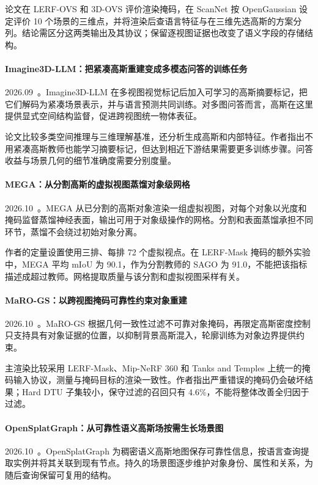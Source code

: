 论文在 LERF-OVS 和 3D-OVS 评价渲染掩码，在 ScanNet 按 OpenGaussian 设定评价 10 个场景的三维点，并将渲染后查语言特征与在三维先选高斯的方案分列。结论需区分这两类输出及其协议；保留逐视图证据也改变了语义字段的存储结构。

\paragraph{Imagine3D-LLM：把紧凑高斯重建变成多模态问答的训练任务}
2026.09~\cite{2609_38177}。Imagine3D-LLM 在多视图视觉标记后加入可学习的高斯摘要标记，把它们解码为紧凑场景表示，并与语言预测共同训练。对多图问答而言，高斯在这里提供显式空间结构监督，促进跨视图统一物体表征。

论文比较多类空间推理与三维理解基准，还分析生成高斯和内部特征。作者指出不用紧凑高斯教师也能学习摘要标记，但达到相近下游结果需要更多训练步骤。问答收益与场景几何的细节准确度需要分别度量。

\paragraph{MEGA：从分割高斯的虚拟视图蒸馏对象级网格}
2026.10~\cite{2610_01707}。MEGA 从已分割的高斯对象渲染一组虚拟视图，对每个对象以光度和掩码监督蒸馏神经表面，输出可用于对象级操作的网格。分割和表面蒸馏承担不同环节，蒸馏不会绕过初始对象分离。

作者的定量设置使用三排、每排 72 个虚拟视点。在 LERF-Mask 掩码的额外实验中，MEGA 平均 mIoU 为 90.1，作为分割教师的 SAGO 为 91.0，不能把该指标描述成超过教师。网格提取质量与该分割和虚拟视图采样有关。

\paragraph{MaRO-GS：以跨视图掩码可靠性约束对象重建}
2026.10~\cite{2610_06472}。MaRO-GS 根据几何一致性过滤不可靠对象掩码，再限定高斯密度控制只支持具有对象证据的位置，以抑制背景高斯混入，轮廓训练为对象边界提供约束。

主渲染比较采用 LERF-Mask、Mip-NeRF 360 和 Tanks and Temples 上统一的掩码输入协议，测量与掩码目标的渲染一致性。作者指出严重错误的掩码仍会破坏结果；Hard DTU 子集较小，保守过滤的召回只有 4.6\%，不能将整体改善全归因于过滤。

\paragraph{OpenSplatGraph：从可靠性语义高斯场按需生长场景图}
2026.10~\cite{2610_07569}。OpenSplatGraph 为稠密语义高斯地图保存可靠性信息，按语言查询提取实例并将其关联到现有节点。持久的场景图逐步维护对象身份、属性和关系，为随后查询保留可复用的结构。

